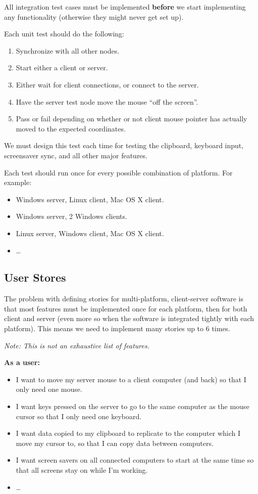 All integration test cases must be implemented \textbf{before} we start 
implementing any functionality (otherwise they might never get set up).

Each unit test should do the following:

\begin{enumerate}
  \item Synchronize with all other nodes.
  \item Start either a client or server.
  \item Either wait for client connections, or connect to the server.
  \item Have the server test node move the mouse ``off the screen''.
  \item Pass or fail depending on whether or not client mouse pointer has
    actually moved to the expected coordinates.
\end{enumerate}

We must design this test each time for testing the clipboard, keyboard input,
screensaver sync, and all other major features.

Each test should run once for every possible combination of platform. For 
example:

\begin{itemize}
  \item Windows server, Linux client, Mac OS X client.
  \item Windows server, 2 Windows clients.
  \item Linux server, Windows client, Mac OS X client.
  \item \ldots
\end{itemize}

\subsection{User Stores}

The problem with defining stories for multi-platform, client-server software
is that most features must be implemented once for each platform, then for both
client and server (even more so when the software is integrated tightly with
each platform). This means we need to implement many stories up to 6 times.

\textit{Note: This is not an exhaustive list of features.}

\textbf{As a user:}

\begin{itemize}
  \item I want to move my server mouse to a client computer (and back) so that 
    I only need one mouse.
  \item I want keys pressed on the server to go to the same computer as the
    mouse cursor so that I only need one keyboard.
  \item I want data copied to my clipboard to replicate to the computer which
    I move my cursor to, so that I can copy data between computers.
  \item I want screen savers on all connected computers to start at the same
    time so that all screens stay on while I'm working.
  \item \ldots
\end{itemize}

